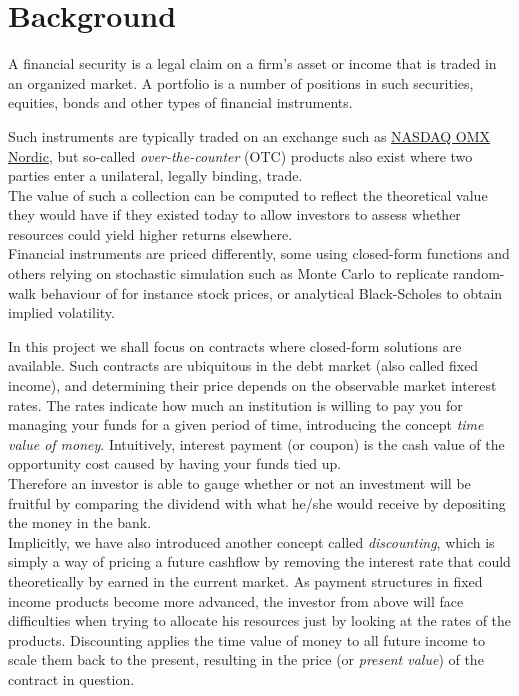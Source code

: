 \chapter{Background}

A financial security is a legal claim on a firm's asset or income 
that is traded in an organized market\cite{alexander2008market}.
A portfolio is  a number of positions in such securities, equities, bonds
and other types of financial instruments. 

Such instruments are typically traded on an exchange such as 
\href{http://www.nasdaqomxnordic.com/}{NASDAQ OMX Nordic}, but so-called
\emph{over-the-counter} (OTC) products also exist where two parties enter
a unilateral, legally binding, trade.\\
The value of such a collection can be computed to reflect the theoretical 
value they would have if they existed today to allow investors to assess
whether resources could yield higher returns elsewhere.\\

Financial instruments are priced differently, some using closed-form functions
and others relying on stochastic simulation such as Monte Carlo to replicate 
random-walk behaviour of for instance stock prices, or analytical Black-Scholes
to obtain implied volatility\cite{HULL}.

In this project we shall focus on contracts where closed-form solutions are
available. Such contracts are ubiquitous in the debt market (also called fixed
income), and determining their price depends on the observable market interest
rates. The rates indicate how much an institution is willing to pay you for
managing your funds for a given period of time, introducing the concept
\emph{time value of money}. Intuitively, interest payment (or coupon) is
the cash value of the opportunity cost caused by having your funds tied up.\\
Therefore an investor is able to gauge whether or not an investment will be
fruitful by comparing the dividend with what he/she would receive by depositing
the money in the bank.\\

Implicitly, we have also introduced another concept called \emph{discounting},
which is simply a way of pricing a future cashflow by removing the interest
rate that could theoretically by earned in the current market. As payment structures
in fixed income products become more advanced, the investor from above will 
face difficulties when trying to allocate his resources just by looking at the
rates of the products. Discounting applies the time value of money to all
future income to scale them back to the present, resulting in the price (or
\emph{present value}) of the contract in question. 

